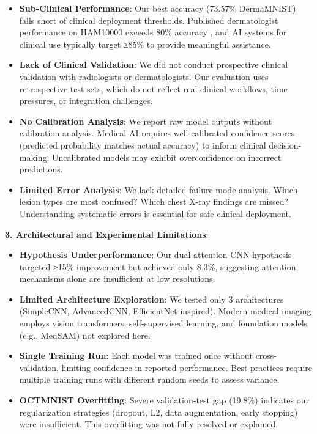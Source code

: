 \documentclass[12pt,a4paper]{article}
\begin{document}
\begin{itemize}
    \item \textbf{Sub-Clinical Performance}: Our best accuracy (73.57\% DermaMNIST) falls short of clinical deployment thresholds. Published dermatologist performance on HAM10000 exceeds 80\% accuracy \cite{esteva2017dermatologist}, and AI systems for clinical use typically target ≥85\% to provide meaningful assistance.
    
    \item \textbf{Lack of Clinical Validation}: We did not conduct prospective clinical validation with radiologists or dermatologists. Our evaluation uses retrospective test sets, which do not reflect real clinical workflows, time pressures, or integration challenges.
    
    \item \textbf{No Calibration Analysis}: We report raw model outputs without calibration analysis. Medical AI requires well-calibrated confidence scores (predicted probability matches actual accuracy) to inform clinical decision-making. Uncalibrated models may exhibit overconfidence on incorrect predictions.
    
    \item \textbf{Limited Error Analysis}: We lack detailed failure mode analysis. Which lesion types are most confused? Which chest X-ray findings are missed? Understanding systematic errors is essential for safe clinical deployment.
\end{itemize}

\textbf{3. Architectural and Experimental Limitations}:

\begin{itemize}
    \item \textbf{Hypothesis Underperformance}: Our dual-attention CNN hypothesis targeted ≥15\% improvement but achieved only 8.3\%, suggesting attention mechanisms alone are insufficient at low resolutions.
    
    \item \textbf{Limited Architecture Exploration}: We tested only 3 architectures (SimpleCNN, AdvancedCNN, EfficientNet-inspired). Modern medical imaging employs vision transformers, self-supervised learning, and foundation models (e.g., MedSAM) not explored here.
    
    \item \textbf{Single Training Run}: Each model was trained once without cross-validation, limiting confidence in reported performance. Best practices require multiple training runs with different random seeds to assess variance.
    
    \item \textbf{OCTMNIST Overfitting}: Severe validation-test gap (19.8\%) indicates our regularization strategies (dropout, L2, data augmentation, early stopping) were insufficient. This overfitting was not fully resolved or explained.
\end{itemize}
\end{document}
